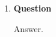 \documentclass{64110}
\author{Emira Ibrahimović}
\begin{document}
\begin{enumerate}

\item \textbf{Question}

Answer.

\end{enumerate}
\end{document}

